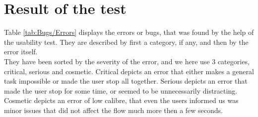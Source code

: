 \section{Result of the test}
Table \ref{tab:Bugs/Errors} displays the errors or bugs, that was found by the help of the usability test. They are described by first a category, if any, and then by the error itself.\\
They have been sorted by the severity of the error, and we here use 3 categories, critical, serious and cosmetic. Critical depicts an error that either makes a general task impossible or made the user stop all together. Serious depicts an error that made the user stop for some time, or seemed to be unnecessarily distracting. Cosmetic depicts an error of low calibre, that even the users informed us was minor issues that did not affect the flow much more then a few seconds.\\
\\

